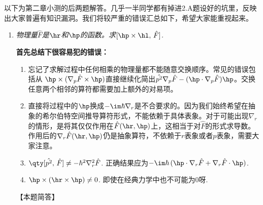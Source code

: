 以下为第二章小测的后两题解答。几乎一半同学都有掉进2.A题设好的坑里，反映出大家普遍有知识漏洞。我们将较严重的错误汇总如下，希望大家能重视起来。

\begin{enumerate}[label=2.\Alph*]
\item
\emph{物理量$\hat{F}$是$\hr$和$\hp$的函数。求$[\hp\times\hl,\,\hat{F}]$.}

{\color{red}\textbf{首先总结下很容易犯的错误：}}
\begin{enumerate}
    \item 忘记了求解过程中任何相乘的物理量都不能随意交换顺序。常见的错误包括从
    $\hp\times(\nabla_p\hat{F}\times\hp)$直接继续化简出$\hat{p^2}\nabla_p\hat{F}-(\hp\cdot\nabla_p\hat{F})\hp$。交换任意两个相邻的算符都需要加上额外的对易项。
    
    \item 直接将过程中的$\hp$换成$-\im\hbar\nabla_r$是不合要求的。因为我们始终希望在抽象的希尔伯特空间推导算符形式，不能依赖于具体表象。对于可能出现$\nabla_r$的情形，是将其仅仅作用在$\hat{F}(\hr,\hp)$上，这相当于对$\hat{F}$的形式求导数。作用后的$\nabla_r\hat{F}(\hr,\hp)$仍是抽象算符，不依赖于$r$表象或者$p$表象，需要大家注意。
    
    \item $\qty[\hat{p^2},\,\hat{F}]\neq-\hbar^2\nabla^2_r \hat{F}$. 正确结果应为$-\im\hbar\,(\hp\cdot \nabla_r\hat{F} + \nabla_r\hat{F}\cdot \hp)$.
    
    \item $\hp\times(\hr\times\hp)\neq 0$. 即使在经典力学中也不可能为0呀.
\end{enumerate}
【本题简答】


\end{enumerate}
